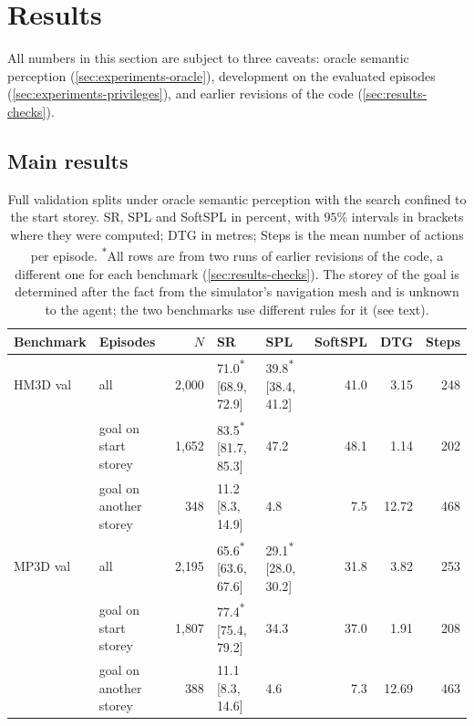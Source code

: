 \documentclass[10pt]{article}
\newcommand{\oldrev}{\textsuperscript{$\ast$}}
\begin{document}
\section{Results}\label{sec:results}

All numbers in this section are subject to three caveats: oracle semantic
perception (\cref{sec:experiments-oracle}), development on the evaluated
episodes (\cref{sec:experiments-privileges}), and earlier revisions of the
code (\cref{sec:results-checks}).

\subsection{Main results}\label{sec:results-main}

\begin{table}[t]
\centering
\caption{Full validation splits under oracle semantic perception with the
search confined to the start storey. SR, SPL and SoftSPL in percent, with
$95\%$ intervals in brackets where they were computed; DTG in metres; Steps is
the mean number of actions per episode. \oldrev{}All rows are from two runs of
earlier revisions of the code, a different one for each benchmark
(\cref{sec:results-checks}). The
storey of the goal is determined after the fact from the simulator's
navigation mesh and is unknown to the agent; the two benchmarks use different
rules for it (see text).}
\label{tab:main}
\small
\setlength{\tabcolsep}{4.5pt}
\begin{tabular}{@{}llrllrrr@{}}
\toprule
Benchmark & Episodes & $N$ & SR & SPL & SoftSPL & DTG & Steps \\
\midrule
HM3D val & all                    & 2{,}000 & 71.0\oldrev{} [68.9, 72.9] & 39.8\oldrev{} [38.4, 41.2] & 41.0 & 3.15 & 248 \\
         & goal on start storey   & 1{,}652 & 83.5\oldrev{} [81.7, 85.3] & 47.2 & 48.1 & 1.14 & 202 \\
         & goal on another storey & 348     & 11.2 [8.3, 14.9]  & 4.8  & 7.5 & 12.72 & 468 \\
\midrule
MP3D val & all                    & 2{,}195 & 65.6\oldrev{} [63.6, 67.6] & 29.1\oldrev{} [28.0, 30.2] & 31.8 & 3.82 & 253 \\
         & goal on start storey   & 1{,}807 & 77.4\oldrev{} [75.4, 79.2] & 34.3 & 37.0 & 1.91 & 208 \\
         & goal on another storey & 388     & 11.1 [8.3, 14.6]  & 4.6  & 7.3  & 12.69 & 463 \\
\bottomrule
\end{tabular}
\end{table}
\end{document}
